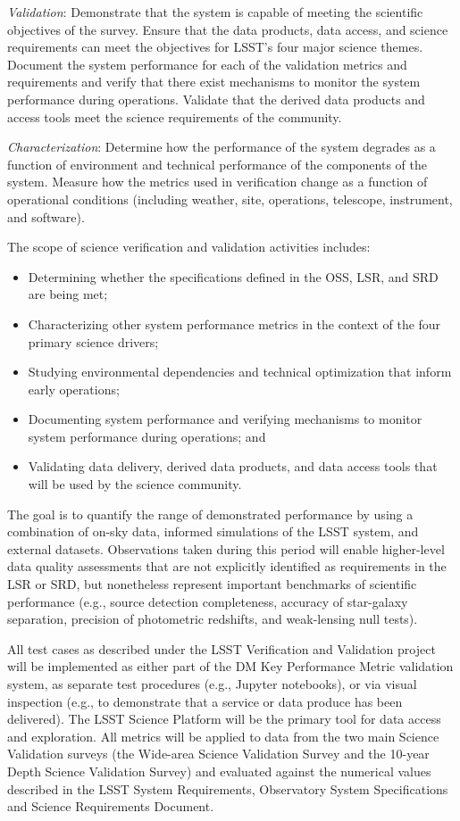 {\it Validation}: Demonstrate that the system is capable of meeting the scientific objectives of the survey. Ensure that the data products, data access, and science requirements can meet the objectives for LSST’s four major science themes. Document the system performance for each of the validation metrics and requirements and verify that there exist mechanisms to monitor the system performance during operations. Validate that the derived data products and access tools meet the science requirements of the community.

{\it Characterization}: Determine how the performance of the system degrades as a function of environment and technical performance of the components of the system. Measure how the metrics used in verification change as a function of operational conditions (including weather, site, operations, telescope, instrument, and software).

The scope of science verification and validation activities includes:

\begin{itemize}
	\item Determining whether the specifications defined in the OSS, LSR, and SRD are being met;
	\item Characterizing other system performance metrics in the context of the four primary science drivers;
	\item Studying environmental dependencies and technical optimization that inform early operations;
	\item Documenting system performance and verifying mechanisms to monitor system performance during operations; and
	\item Validating data delivery, derived data products, and data access tools that will be used by the science community.
\end{itemize}

The goal is to quantify the range of demonstrated performance by using a combination of on-sky data, informed simulations of the LSST system, and external datasets. Observations taken during this period will enable higher-level data quality assessments that are not explicitly identified as requirements in the LSR or SRD, but nonetheless represent important benchmarks of scientific performance (e.g., source detection completeness, accuracy of star-galaxy separation, precision of photometric redshifts, and weak-lensing null tests). 

All test cases as described under the LSST Verification and Validation  project will be implemented as either part of the DM Key Performance Metric validation system, as separate test procedures (e.g., Jupyter notebooks), or via visual inspection (e.g., to demonstrate that a service or data produce has been delivered). The LSST Science Platform will be the primary tool for data access and exploration. All metrics will be applied to data from the two main Science Validation surveys (the Wide-area Science Validation Survey and the 10-year Depth Science Validation Survey) and evaluated against the numerical values described in the LSST System Requirements, Observatory System Specifications and Science Requirements Document.

